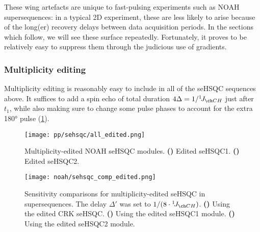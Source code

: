 These wing artefacts are unique to fast-pulsing experiments such as NOAH supersequences: in a typical 2D experiment, these are less likely to arise because of the long(er) recovery delays between data acquisition periods.
In the sections which follow, we will see these surface repeatedly.
Fortunately, it proves to be relatively easy to suppress them through the judicious use of gradients.


\subsubsection{Multiplicity editing}

Multiplicity editing is reasonably easy to include in all of the seHSQC sequences above.
It suffices to add a spin echo of total duration $4\Delta = 1 / \oneJ{CH}$ just after $t_1$, while also making sure to change some pulse phases to account for the extra \proton{} \ang{180} pulse (\cref{fig:sehsqc_edited}).

\begin{figure}[!ht]
    \centering
    \texttt{[image: pp/sehsqc/all\_edited.png]}%
    {\label{fig:sehsqc_edited_1}}%
    {\label{fig:sehsqc_edited_2}}%
    \caption[Multiplicity-edited NOAH seHSQC modules]{
        Multiplicity-edited NOAH seHSQC modules.
        \textbf{()} Edited seHSQC1.
        \textbf{()} Edited seHSQC2.
    }
    \label{fig:sehsqc_edited}
\end{figure}

\begin{figure}[!ht]
    \centering
    \texttt{[image: noah/sehsqc\_comp\_edited.png]}%
    {\label{fig:noah_sehsqc_comp_edited_crk}}%
    {\label{fig:noah_sehsqc_comp_edited_1}}%
    {\label{fig:noah_sehsqc_comp_edited_2}}%
    \caption[Sensitivity comparisons for multiplicity-edited seHSQC]{
        Sensitivity comparisons for multiplicity-edited seHSQC in  supersequences.
        The delay $\Delta'$ was set to $1 / (8 \cdot \oneJ{CH})$.
        \textbf{()} Using the edited CRK seHSQC.
        \textbf{()} Using the edited seHSQC1 module.
        \textbf{()} Using the edited seHSQC2 module.
    }
    \label{fig:noah_sehsqc_comp_edited}
\end{figure}


